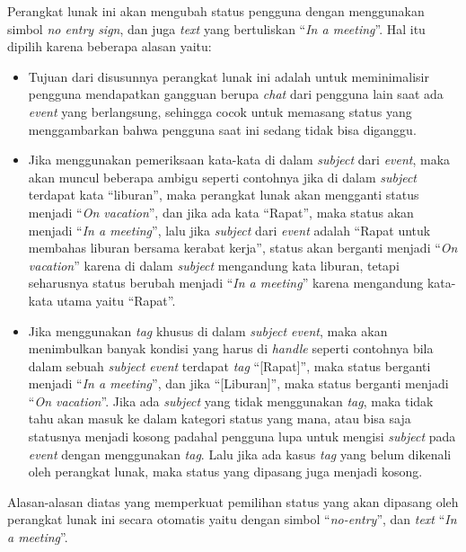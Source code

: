 Perangkat lunak ini akan mengubah status pengguna dengan menggunakan simbol \textit{no entry sign}, dan juga \textit{text} yang bertuliskan ``\textit{In a meeting}''. Hal itu dipilih karena beberapa alasan yaitu:
\begin{itemize}
    \item Tujuan dari disusunnya perangkat lunak ini adalah untuk meminimalisir pengguna mendapatkan gangguan berupa \textit{chat} dari pengguna lain saat ada \textit{event} yang berlangsung, sehingga cocok untuk memasang status yang menggambarkan bahwa pengguna saat ini sedang tidak bisa diganggu. 
    \item Jika menggunakan pemeriksaan kata-kata di dalam \textit{subject} dari \textit{event}, maka akan muncul beberapa ambigu seperti contohnya jika di dalam \textit{subject} terdapat kata ``liburan'', maka perangkat lunak akan mengganti status menjadi ``\textit{On vacation}'', dan jika ada kata ``Rapat'', maka status akan menjadi ``\textit{In a meeting}'', lalu jika \textit{subject} dari \textit{event} adalah ``Rapat untuk membahas liburan bersama kerabat kerja'', status akan berganti menjadi ``\textit{On vacation}'' karena di dalam \textit{subject} mengandung kata liburan, tetapi seharusnya status berubah menjadi ``\textit{In a meeting}'' karena mengandung kata-kata utama yaitu ``Rapat''. 
    \item Jika menggunakan \textit{tag} khusus di dalam \textit{subject event}, maka akan menimbulkan banyak kondisi yang harus di \textit{handle} seperti contohnya bila dalam sebuah \textit{subject event} terdapat \textit{tag} ``[Rapat]'', maka status berganti menjadi ``\textit{In a meeting}'', dan jika ``[Liburan]'', maka status berganti menjadi ``\textit{On vacation}''. Jika ada \textit{subject} yang tidak menggunakan \textit{tag}, maka tidak tahu akan masuk ke dalam kategori status yang mana, atau bisa saja statusnya menjadi kosong padahal pengguna lupa untuk mengisi \textit{subject} pada \textit{event} dengan menggunakan \textit{tag}. Lalu jika ada kasus \textit{tag} yang belum dikenali oleh perangkat lunak, maka status yang dipasang juga menjadi kosong. 
\end{itemize}

Alasan-alasan diatas yang memperkuat pemilihan status yang akan dipasang oleh perangkat lunak ini secara otomatis yaitu dengan simbol ``\textit{no-entry}'', dan \textit{text} ``\textit{In a meeting}''. 

